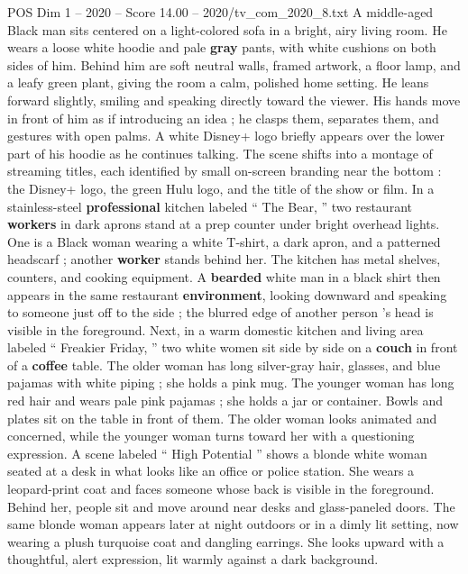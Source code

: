\begin{textsample}{POS Dim 1 – 2020 – Score 14.00 – 2020/tv\_com\_2020\_8.txt}  \label{ex:f1_pos_018}
A middle-aged Black man sits centered on a light-colored sofa in a bright, airy living room.
He wears a loose white hoodie and pale \textbf{gray} pants, with white cushions on both sides of him.
Behind him are soft neutral walls, framed artwork, a floor lamp, and a leafy green plant, giving the room a calm, polished home setting.
He leans forward slightly, smiling and speaking directly toward the viewer.
His hands move in front of him as if introducing an idea ; he clasps them, separates them, and gestures with open palms.
A white Disney+ logo briefly appears over the lower part of his hoodie as he continues talking.
The scene shifts into a montage of streaming titles, each identified by small on-screen branding near the bottom : the Disney+ logo, the green Hulu logo, and the title of the show or film.
In a stainless-steel \textbf{professional} kitchen labeled “ The Bear, ” two restaurant \textbf{workers} in dark aprons stand at a prep counter under bright overhead lights.
One is a Black woman wearing a white T-shirt, a dark apron, and a patterned headscarf ; another \textbf{worker} stands behind her.
The kitchen has metal shelves, counters, and cooking equipment.
A \textbf{bearded} white man in a black shirt then appears in the same restaurant \textbf{environment}, looking downward and speaking to someone just off to the side ; the blurred edge of another person ’s head is visible in the foreground.
Next, in a warm domestic kitchen and living area labeled “ Freakier Friday, ” two white women sit side by side on a \textbf{couch} in front of a \textbf{coffee} table.
The older woman has long silver-gray hair, glasses, and blue pajamas with white piping ; she holds a pink mug.
The younger woman has long red hair and wears pale pink pajamas ; she holds a jar or container.
Bowls and plates sit on the table in front of them.
The older woman looks animated and concerned, while the younger woman turns toward her with a questioning expression.
A scene labeled “ High Potential ” shows a blonde white woman seated at a desk in what looks like an office or police station.
She wears a leopard-print coat and faces someone whose back is visible in the foreground.
Behind her, people sit and move around near desks and glass-paneled doors.
The same blonde woman appears later at night outdoors or in a dimly lit setting, now wearing a plush turquoise coat and dangling earrings.
She looks upward with a thoughtful, alert expression, lit warmly against a dark background.

\end{textsample}
